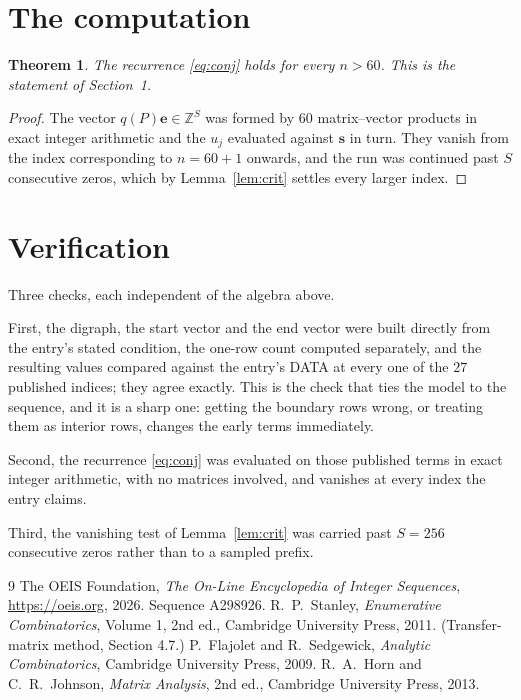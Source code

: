 \documentclass[11pt,a4paper]{article}
\theoremstyle{plain}
\newtheorem{theorem}{Theorem}
\theoremstyle{definition}
\begin{document}
\section{The computation}

\begin{theorem}
The recurrence \eqref{eq:conj} holds for every $n>60$. This is the statement of
Section~1.
\end{theorem}

\begin{proof}
The vector $q(P)\mathbf{e}\in\mathbb{Z}^{S}$ was formed by $60$ matrix--vector
products in exact integer arithmetic and the $u_j$ evaluated against $\mathbf{s}$ in turn.
They vanish from the index corresponding to $n=60+1$ onwards, and the run was continued
past $S$ consecutive zeros, which by Lemma~\ref{lem:crit} settles every larger index.
\end{proof}

\section{Verification}

Three checks, each independent of the algebra above.

First, the digraph, the start vector and the end vector were built directly from the
entry's stated condition, the one-row count computed separately, and the resulting values
compared against the entry's DATA at every one of the $27$ published indices; they
agree exactly. This is the check that ties the model to the sequence, and it is a sharp one:
getting the boundary rows wrong, or treating them as interior rows, changes the early terms
immediately.

Second, the recurrence \eqref{eq:conj} was evaluated on those published terms in exact
integer arithmetic, with no matrices involved, and vanishes at every index the entry claims.

Third, the vanishing test of Lemma~\ref{lem:crit} was carried past $S=256$ consecutive
zeros rather than to a sampled prefix.

\begin{thebibliography}{9}
 The OEIS Foundation, \emph{The On-Line Encyclopedia of Integer
Sequences}, \url{https://oeis.org}, 2026. Sequence A298926.
 R.~P.~Stanley, \emph{Enumerative Combinatorics}, Volume 1, 2nd ed.,
Cambridge University Press, 2011. (Transfer-matrix method, Section 4.7.)
 P.~Flajolet and R.~Sedgewick, \emph{Analytic Combinatorics}, Cambridge
University Press, 2009.
 R.~A.~Horn and C.~R.~Johnson, \emph{Matrix Analysis}, 2nd ed., Cambridge
University Press, 2013.
\end{thebibliography}
\end{document}
